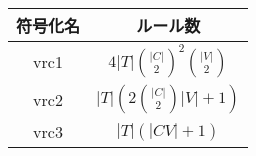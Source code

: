\begin{tabular}{|c|c|}\hline
  符号化名 & ルール数 \\ \hline
  vrc1 & $4|T|{|C|\choose 2}^{2}{|V|\choose 2}$ \\ \hline
  vrc2 & $|T|\left(2{|C|\choose 2}|V| + 1\right)$ \\ \hline
  vrc3 & $|T|(|CV| + 1)$ \\ \hline
\end{tabular}